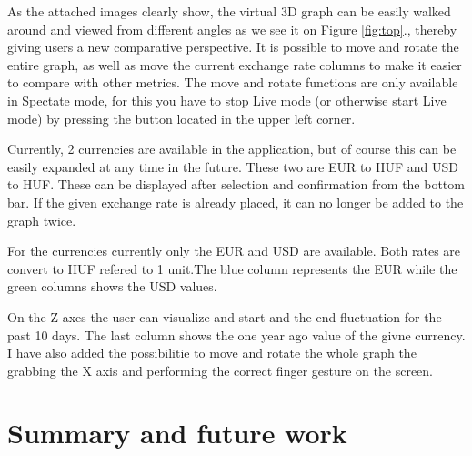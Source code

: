 \documentclass[a4paper,oneside]{article}
\begin{document}
As the attached images clearly show, the virtual 3D graph can be easily walked around and viewed from different angles as we see it on Figure \ref{fig:top}., thereby giving users a new comparative perspective. It is possible to move and rotate the entire graph, as well as move the current exchange rate columns to make it easier to compare with other metrics. The move and rotate functions are only available in Spectate mode, for this you have to stop Live mode (or otherwise start Live mode) by pressing the button located in the upper left corner.

Currently, 2 currencies are available in the application, but of course this can be easily expanded at any time in the future. These two are EUR to HUF and USD to HUF. These can be displayed after selection and confirmation from the bottom bar. If the given exchange rate is already placed, it can no longer be added to the graph twice.

For the currencies currently only the EUR and USD are available. Both rates are convert to HUF refered to 1 unit.The blue column represents the EUR while the green columns shows the USD values.

On the Z axes the user can visualize and start and the end fluctuation for the past 10 days. The last column shows the one year ago value of the givne currency.
I have also added the possibilitie to move and rotate the whole graph the grabbing the X axis and performing the correct finger gesture on the screen.






\section{Summary and future work}
\label{sec:osszefoglalas}
\end{document}

